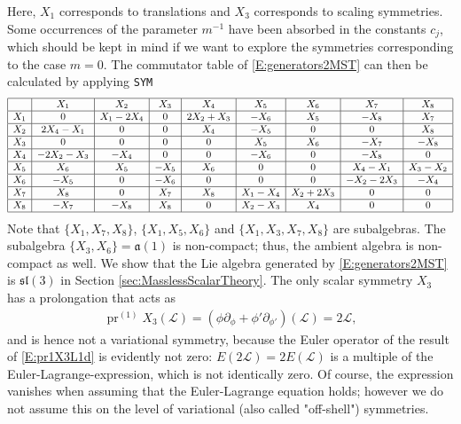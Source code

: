 \documentclass[a4paper,hidelinks, 12pt]{article}
\numberwithin{equation}{section}
\theoremstyle{plain}
\newcommand{\La}{\mathfrak}
\newcommand{\mc}{\mathcal}
\newcommand{\on}{\operatorname}
\begin{document}
Here, $X_1$ corresponds to translations and $X_3$ corresponds to scaling symmetries.
Some occurrences of the parameter $m^{-1}$ have been absorbed in the constants $c_j$, which should be kept in mind if we want to explore the symmetries corresponding to the case $m=0$. The commutator table of
 \eqref{E:generators2MST} can then be calculated by applying \texttt{SYM} \cite{dimas2005sym}
\begin{align}\label{T:comm_mne0}
\small{	\begin{array}{|c|c|c|c|c|c|c|c|c|}
\hline	
 \text{} & X_1 & X_2 & X_3 & X_4 & X_5 & X_6 & X_7 & X_8 \\ \hline
 X_1 & 0 & X_1-2 X_4 & 0 & 2 X_2+X_3 & -X_6 & X_5 & -X_8 & X_7 \\ \hline
 X_2 & 2 X_4-X_1 & 0 & 0 & X_4 & -X_5 & 0 & 0 & X_8 \\ \hline
 X_3 & 0 & 0 & 0 & 0 & X_5 & X_6 & -X_7 & -X_8 \\ \hline
 X_4 & -2 X_2-X_3 & -X_4 & 0 & 0 & -X_6 & 0 & -X_8 & 0 \\ \hline
 X_5 & X_6 & X_5 & -X_5 & X_6 & 0 & 0 & X_4-X_1 & X_3-X_2 \\ \hline
 X_6 & -X_5 & 0 & -X_6 & 0 & 0 & 0 & -X_2-2 X_3 & -X_4 \\ \hline
 X_7 & X_8 & 0 & X_7 & X_8 & X_1-X_4 & X_2+2 X_3 & 0 & 0 \\ \hline
 X_8 & -X_7 & -X_8 & X_8 & 0 & X_2-X_3 & X_4 & 0 & 0 \\ \hline
\end{array}}
\end{align}
Note that $\{X_1, X_7, X_8\}$, $\{X_1, X_5, X_6\}$  and $\{X_1, X_3, X_7, X_8\}$
are subalgebras. The subalgebra $\{X_3, X_6\}=\La{a}(1)$ is non-compact; thus,
the ambient algebra is non-compact as well.
We show that the Lie algebra generated by \eqref{E:generators2MST} is $\La{sl}(3)$ in Section \eqref{sec:MasslessScalarTheory}. The only scalar symmetry
$X_3$ has a prolongation that acts as
\begin{align}\label{E:pr1X3L1d}
	\on{pr}^{(1)}X_3(\mc{L})=(\phi \partial_\phi + \phi' \partial_{\phi'})(\mc{L})=2\mc{L},
\end{align}
and is hence not a variational symmetry, because the Euler operator of the result of \eqref{E:pr1X3L1d} is evidently not zero: $E(2\mc{L})=2E(\mc{L})$ is a multiple of the Euler-Lagrange-expression, which is not identically zero. Of course, the expression vanishes when assuming that the Euler-Lagrange equation holds; however we do not assume this on the level of variational (also called "off-shell") symmetries.
\end{document}
